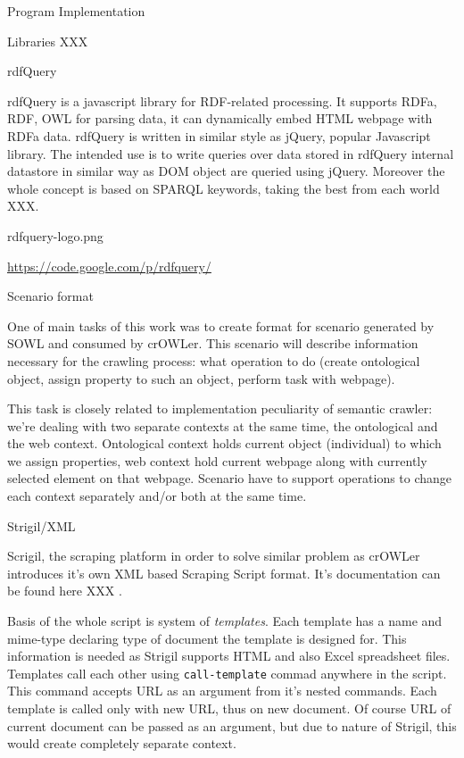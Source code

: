  
\chap Program Implementation

\sec Libraries XXX

\secc rdfQuery

rdfQuery is a javascript library for RDF-related processing. It supports RDFa,
RDF, OWL for parsing data, it can dynamically embed HTML webpage with RDFa
data. rdfQuery is written in similar style as jQuery, popular Javascript
library. The intended use is to write queries over data stored in rdfQuery
internal datastore in similar way as DOM object are queried using jQuery.
Moreover the whole concept is based on SPARQL keywords, taking the best from
each world XXX. 

\picw=1cm \cinspic rdfquery-logo.png

\url{https://code.google.com/p/rdfquery/}


\sec Scenario format

One of main tasks of this work was to create format for scenario generated by
SOWL and consumed by crOWLer. This scenario will describe information necessary
for the crawling process: what operation to do (create ontological object,
assign property to such an object, perform task with webpage). 

This task is closely related to implementation peculiarity of semantic crawler:
we're dealing with two separate contexts at the same time, the ontological and
the web context. Ontological context holds current object (individual) to which
we assign properties, web context hold current webpage along with currently
selected element on that webpage. Scenario have to support operations to change
each context separately and/or both at the same time. 



\secc Strigil/XML

Scrigil, the scraping platform in order to solve similar problem as crOWLer
introduces it's own XML based Scraping Script format. It's documentation can be
found here XXX
. 

Basis of the whole script is system of {\em templates}. Each template has a name
and mime-type declaring type of document the template is designed for. This
information is needed as Strigil supports HTML and also Excel spreadsheet
files. Templates call each other using {\tt call-template} commad anywhere in
the script. This command accepts URL as an argument from it's nested commands.
Each template is called only with new URL, thus on new document. Of course URL
of current document can be passed as an argument, but due to nature of Strigil,
this would create completely separate context. 

